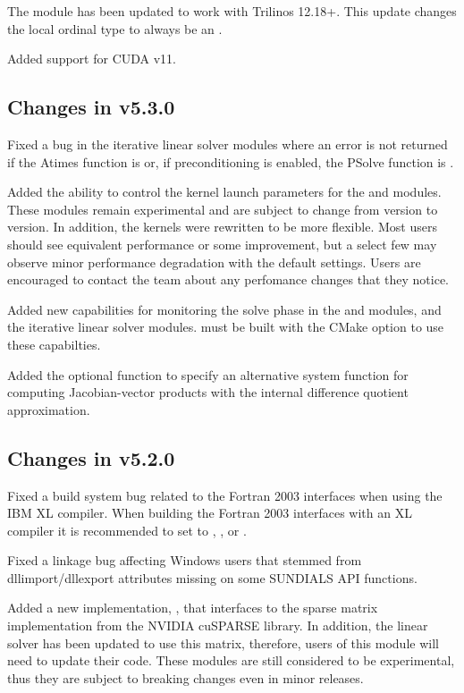 The  module has been updated to work with Trilinos 12.18+.
This update changes the local ordinal type to always be an .

Added support for CUDA v11.


\subsection*{Changes in v5.3.0}

Fixed a bug in the iterative linear solver modules where an error is not
returned if the Atimes function is  or, if preconditioning is enabled,
the PSolve function is .

Added the ability to control the {\cuda} kernel launch parameters for the
 and  modules. These modules remain
experimental and are subject to change from version to version.
In addition, the  kernels were rewritten to be more flexible.
Most users should see equivalent performance or some improvement, but a select
few may observe minor performance degradation with the default settings. Users
are encouraged to contact the {\sundials} team about any perfomance changes
that they notice.

Added new capabilities for monitoring the solve phase in the {\sunnonlinsolnewton}
and {\sunnonlinsolfixedpoint} modules, and the {\sundials} iterative linear solver
modules. {\sundials} must be built with the CMake option
 to use these capabilties.

Added the optional function  to specify an
alternative system function for computing Jacobian-vector products with the
internal difference quotient approximation.

\subsection*{Changes in v5.2.0}

Fixed a build system bug related to the Fortran 2003 interfaces when using the
IBM XL compiler. When building the Fortran 2003 interfaces with an XL compiler
it is recommended to set  to ,
, or .

Fixed a linkage bug affecting Windows users that stemmed from dllimport/dllexport
attributes missing on some SUNDIALS API functions.

Added a new  implementation, , that interfaces
to the sparse matrix implementation from the NVIDIA cuSPARSE library. In addition,
the  linear solver has been updated to
use this matrix, therefore, users of this module will need to update their code.
These modules are still considered to be experimental, thus they are subject to
breaking changes even in minor releases.

